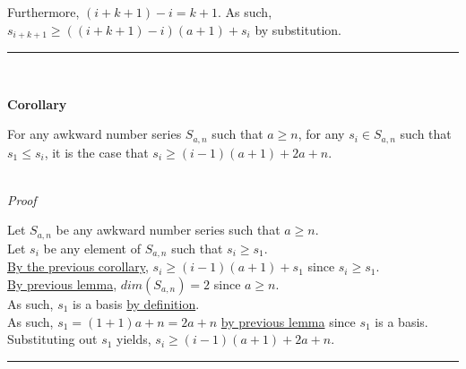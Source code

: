 \documentclass[a4paper,12pt]{article}
\begin{document}
\noindent Furthermore, $(i + k + 1) - i = k + 1$. As such, $s_{i + k + 1} \geq ((i + k + 1) - i)(a + 1) + s_i$ by substitution.

\begin{center}
\noindent\rule{8cm}{0.4pt}
\end{center}
\noindent \\






\label{corollary:min_length_one_staple_pt2}
\hypertarget{corollary:min_length_one_staple_pt2}{}
\begin{tcolorbox}
\textbf{Corollary}

\noindent For any awkward number series $S_{a,n}$ such that $a \geq n$, for any $s_i \in S_{a, n}$ such that $s_1 \leq s_i$, it is the case that $s_i \geq (i - 1)(a + 1) + 2a + n$.

\end{tcolorbox}

\noindent \\
\textit{Proof}

\noindent Let $S_{a, n}$ be any awkward number series such that $a \geq n$.\\

\noindent Let $s_i$ be any element of $S_{a, n}$ such that $s_i \geq s_1$.\\

\noindent \hyperlink{corollary:min_length_one_staple_pt2}{By the previous corollary}, $s_i \geq (i - 1)(a + 1) + s_1$ since $s_i \geq s_1$.\\

\noindent \hyperlink{lemma:dimension_a_greater_equal_n}{By previous lemma}, $dim(S_{a, n}) = 2$ since $a \geq n$.\\

\noindent As such, $s_1$ is a basis \hyperlink{definition:basis}{by definition}.\\

\noindent As such, $s_1 = (1 + 1)a + n = 2a + n$ \hyperlink{lemma:basis_lengths}{by previous lemma} since $s_1$ is a basis.\\

\noindent Substituting out $s_1$ yields, $s_i \geq (i - 1)(a + 1) + 2a + n$.


\begin{center}
\noindent\rule{8cm}{0.4pt}
\end{center}
\noindent \\
\end{document}
